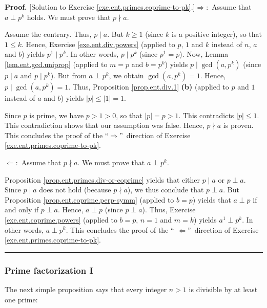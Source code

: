 \documentclass[numbers=enddot,12pt,final,onecolumn,notitlepage]{scrartcl}%
\numberwithin{exer}{subsection}
\theoremstyle{definition}
\newenvironment{fineprint}{\begin{small}}{\end{small}}
\newenvironment{proof}[1][Proof]{\noindent\textbf{#1.} }{\ \rule{0.5em}{0.5em}}
\begin{document}
\begin{fineprint}
\begin{proof}
[Solution to Exercise \ref{exe.ent.primes.coprime-to-pk}.]$\Longrightarrow:$
Assume that $a\perp p^{k}$ holds. We must prove that $p\nmid a$.

Assume the contrary. Thus, $p\mid a$. But $k\geq1$ (since $k$ is a positive
integer), so that $1\leq k$. Hence, Exercise \ref{exe.ent.div.powers} (applied
to $p$, $1$ and $k$ instead of $n$, $a$ and $b$) yields $p^{1}\mid p^{k}$. In
other words, $p\mid p^{k}$ (since $p^{1}=p$). Now, Lemma
\ref{lem.ent.gcd.uniprop} (applied to $m=p$ and $b=p^{k}$) yields $p\mid
\gcd\left(  a,p^{k}\right)  $ (since $p\mid a$ and $p\mid p^{k}$). But from
$a\perp p^{k}$, we obtain $\gcd\left(  a,p^{k}\right)  =1$. Hence, $p\mid
\gcd\left(  a,p^{k}\right)  =1$. Thus, Proposition \ref{prop.ent.div.1}
\textbf{(b)} (applied to $p$ and $1$ instead of $a$ and $b$) yields
$\left\vert p\right\vert \leq\left\vert 1\right\vert =1$.

Since $p$ is prime, we have $p>1>0$, so that $\left\vert p\right\vert =p>1$.
This contradicts $\left\vert p\right\vert \leq1$. This contradiction shows
that our assumption was false. Hence, $p\nmid a$ is proven. This concludes the
proof of the \textquotedblleft$\Longrightarrow$\textquotedblright\ direction
of Exercise \ref{exe.ent.primes.coprime-to-pk}.

$\Longleftarrow:$ Assume that $p\nmid a$. We must prove that $a\perp p^{k}$.

Proposition \ref{prop.ent.primes.div-or-coprime} yields that either $p\mid a$
or $p\perp a$. Since $p\mid a$ does not hold (because $p\nmid a$), we thus
conclude that $p\perp a$. But Proposition \ref{prop.ent.coprime.perp-symm}
(applied to $b=p$) yields that $a\perp p$ if and only if $p\perp a$. Hence,
$a\perp p$ (since $p\perp a$). Thus, Exercise \ref{exe.ent.coprime.powers}
(applied to $b=p$, $n=1$ and $m=k$) yields $a^{1}\perp p^{k}$. In other words,
$a\perp p^{k}$. This concludes the proof of the \textquotedblleft%
$\Longleftarrow$\textquotedblright\ direction of Exercise
\ref{exe.ent.primes.coprime-to-pk}.
\end{proof}
\end{fineprint}

\subsubsection{Prime factorization I}

The next simple proposition says that every integer $n>1$ is divisible by at
least one prime:
\end{document}
